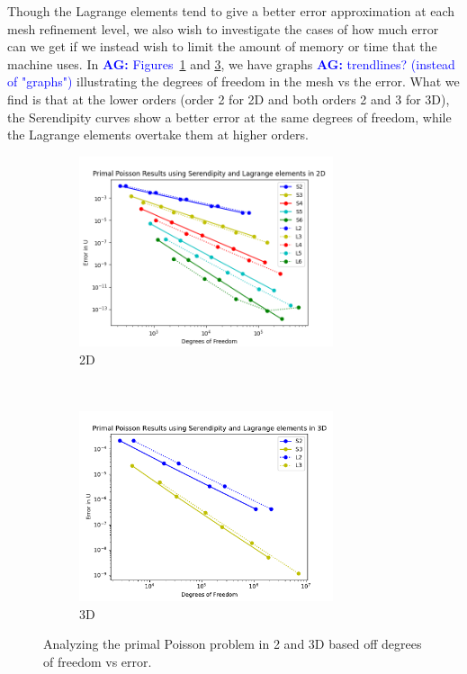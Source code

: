 \documentclass[manuscript,screen]{acmart}
\newcommand{\akg}[1]{\textcolor{blue}{\textbf{AG:} #1}}
\begin{document}
\noindent Though the Lagrange elements tend to give a better error approximation at each mesh refinement level, we also wish to investigate the cases of how much error can we get if we instead wish to limit the amount of memory or time that the machine uses.  In \akg{Figures}~\ref{fig:2dPrimalDofs} and \ref{fig:3dPrimalDofs}, we have graphs \akg{trendlines? (instead of "graphs")} illustrating the degrees of freedom in the mesh vs the error.  What we find is that at the lower orders (order 2 for 2D and both orders 2 and 3 for 3D), the Serendipity curves show a better error  at the same degrees of freedom, while the Lagrange elements overtake them at higher orders.  

\begin{figure}[h!]
  \centering
  \begin{subfigure}[h]{0.5\textwidth}
    \centering
    \includegraphics[height=2.2in]{2dPrimalPoisson.png}
    \caption{2D}
    \label{fig:2dPrimalDofs}
  \end{subfigure}
  ~
  \begin{subfigure}[h]{0.5\textwidth}
    \centering
    \includegraphics[height=2.2in]{3dPrimalDofs.pdf}
    \caption{3D}
    \label{fig:3dPrimalDofs}
  \end{subfigure}
  \caption{Analyzing the primal Poisson problem in 2 and 3D based off degrees of freedom vs error.}
\end{figure}  
\end{document}
